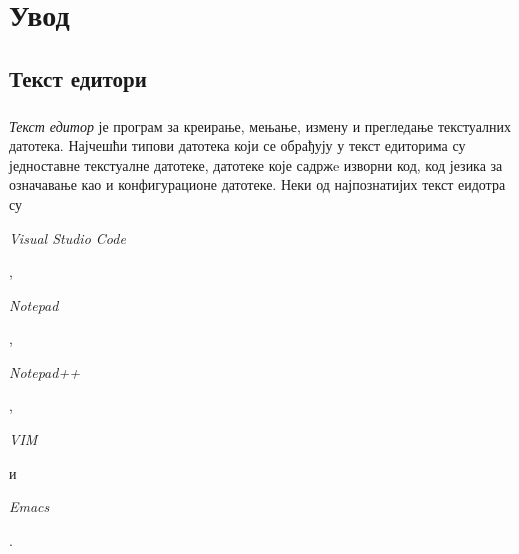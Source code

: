 \documentclass[12pt,oneside]{memoir}
\begin{document}
\frontmatter
\naslovna
\komisija
\posveta{}
\apstrakt
\tableofcontents*

\mainmatter

\chapter{Увод}

\section{Текст едитори}

\paragraph{}
\emph{Текст едитор} је програм за креирање, мењање, измену и прегледање текстуалних датотека. Најчешћи типови датотека
који се обрађују у текст едиторима су једноставне текстуалне датотеке, 
датотеке које садржe изворни код, код језика за означавање као и конфигурационе датотеке.  Неки од најпознатијих текст еидотра су \begin{latinica}\textit{Visual Studio Code}
\end{latinica} \cite{VSC}, \begin{latinica}\textit{Notepad}\end{latinica} \cite{Notepad},
\begin{latinica}\textit{Notepad++}\end{latinica} \cite{Notepad++}, \begin{latinica}\textit{VIM}
\end{latinica} \cite{VIM} и \begin{latinica}\textit{Emacs}\end{latinica} \cite{Emacs}.
\end{document}
